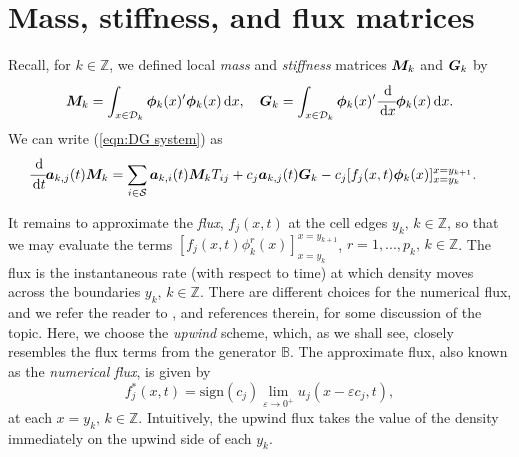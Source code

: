 \section{Mass, stiffness, and flux matrices}\label{sec:llaaksksbnnn}
Recall, for \(k\in\mathbb Z\), we defined local \textit{mass} and \textit{stiffness} matrices \(\boldsymbol M_k\) and \(\boldsymbol G_k\) by 
\[\boldsymbol M_k = \int_{x\in\mathcal{D}_k}\boldsymbol \phi_k(x)'{}\boldsymbol \phi_k(x)\, \mathrm{d} x,\quad \boldsymbol G_k = \int_{x\in\mathcal{D}_k}\boldsymbol \phi_k(x)'{}\cfrac{\, \mathrm{d}}{\, \mathrm{d} x} \boldsymbol \phi_k(x)\, \mathrm{d} x.\]
We can write (\ref{eqn:DG system}) as 
\begin{align}
	&\cfrac{\, \mathrm{d}}{\, \mathrm{d} t} \boldsymbol a_{k,j}(t) \boldsymbol M_k = \sum_{i\in\mathcal{S}} \boldsymbol a_{k,i}(t)\boldsymbol M_kT_{ij} 
	+  c_j\boldsymbol a_{k,j}(t) \boldsymbol G_k - c_j[f_j(x,t)\boldsymbol\phi_k(x)]_{x=y_k}^{x=y_{k+1}}.\label{eqn:DG matrix}
\end{align}

It remains to approximate the \textit{flux}, \(f_j(x,t)\) at the cell edges \(y_k,\,k\in\mathbb Z\), so that we may evaluate the terms \([f_j(x,t)\phi^r_k(x)]_{x=y_k}^{x=y_{k+1}}\), \(r=1,...,p_k,\,k\in\mathbb Z\). %
The flux is the instantaneous rate (with respect to time) at which density moves across the boundaries \(y_k,\,k\in\mathbb Z\). There are different choices for the numerical flux, and we refer the reader to \citep{c99,nodalDGBook}, and references therein, for some discussion of the topic. Here, we choose the \textit{upwind} scheme, which, as we shall see, closely resembles the flux terms from the generator \(\mathbb B\). The approximate flux, also known as the \textit{numerical flux}, is given by 
\[f^*_j(x,t) = \mathrm{sign}(c_j)\lim_{\varepsilon\to0^+}u_j(x-\varepsilon c_j,t),\]
at each \(x=y_k,\,k\in\mathbb Z\). 
Intuitively, the upwind flux takes the value of the density immediately on the upwind side of each \(y_k\). 

